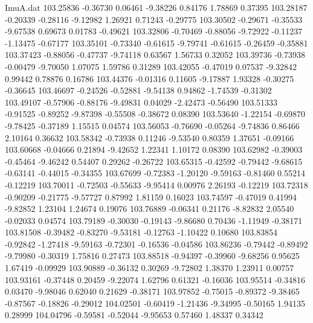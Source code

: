 \begin{filecontents}{ImuA.dat}
 103.25836   -0.36730    0.06461   -9.38226    0.84176    1.78869    0.37395
 103.28187   -0.20339   -0.28116   -9.12982    1.26921    0.71243   -0.29775
 103.30502   -0.29671   -0.35533   -9.67538    0.69673    0.01783   -0.49621
 103.32806   -0.70469   -0.88056   -9.72922   -0.11237   -1.13475   -0.67177
 103.35101   -0.73340   -0.61615   -9.79741   -0.61615   -0.26459   -0.35881
 103.37423   -0.88056   -0.47737   -9.74118    0.63567    1.56733    0.32052
 103.39736   -0.73938   -0.00479   -9.70050    1.07075    1.59786    0.31289
 103.42055   -0.47019    0.07537   -9.32842    0.99442    0.78876    0.16786
 103.44376   -0.01316    0.11605   -9.17887    1.93328   -0.30275   -0.36645
 103.46697   -0.24526   -0.52881   -9.54138    0.94862   -1.74539   -0.31302
 103.49107   -0.57906   -0.88176   -9.49831    0.04029   -2.42473   -0.56490
 103.51333   -0.91525   -0.89252   -9.87398   -0.55508   -0.38672    0.08390
 103.53640   -1.22154   -0.69870   -9.78425   -0.37189    1.15515    0.04574
 103.56053   -0.76690   -0.05264   -9.74836    0.86466    2.10164    0.36632
 103.58342   -0.73938    0.11246   -9.53540    0.80359    1.37651   -0.09166
 103.60668   -0.04666    0.21894   -9.42652    1.22341    1.10172    0.08390
 103.62982   -0.39003   -0.45464   -9.46242    0.54407    0.29262   -0.26722
 103.65315   -0.42592   -0.79442   -9.68615   -0.63141   -0.44015   -0.34355
 103.67699   -0.72383   -1.20120   -9.59163   -0.81460    0.55214   -0.12219
 103.70011   -0.72503   -0.55633   -9.95414    0.00976    2.26193   -0.12219
 103.72318   -0.90209   -0.21775   -9.57727    0.87992    1.81159    0.16023
 103.74597   -0.47019    0.41994   -9.82852    1.23104    1.24674    0.19076
 103.76889   -0.06341    0.21176   -8.82832    2.05540   -0.02033    0.04574
 103.79189   -0.30030   -0.19143   -9.86680    0.70436   -1.11949   -0.38171
 103.81508   -0.39482   -0.83270   -9.53181   -0.12763   -1.10422    0.10680
 103.83854   -0.92842   -1.27418   -9.59163   -0.72301   -0.16536   -0.04586
 103.86236   -0.79442   -0.89492   -9.79980   -0.30319    1.75816    0.27473
 103.88518   -0.94397   -0.39960   -9.68256    0.95625    1.67419   -0.09929
 103.90889   -0.36132    0.30269   -9.72802    1.38370    1.23911    0.00757
 103.93161   -0.37448    0.20459   -9.22074    1.62796    0.61321   -0.16036
 103.95514   -0.34816    0.03470   -9.98046    0.62040    0.21629   -0.38171
 103.97852   -0.75015   -0.89372   -9.38465   -0.87567   -0.18826   -0.29012
 104.02501   -0.60419   -1.21436   -9.34995   -0.50165    1.94135    0.28999
 104.04796   -0.59581   -0.52044   -9.95653    0.57460    1.48337    0.34342

\end{filecontents}
